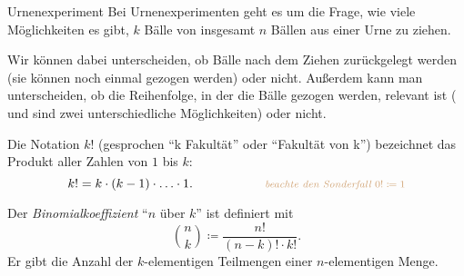 \documentclass[../../main.tex]{subfiles}
\begin{document}
    \begin{nutshell}{Urnenexperiment}
        Bei Urnenexperimenten geht es um die Frage, wie viele Möglichkeiten es gibt, $k$ Bälle von insgesamt $n$ Bällen aus einer Urne zu ziehen.
        
        Wir können dabei unterscheiden, ob Bälle nach dem Ziehen zurückgelegt werden (sie können noch einmal gezogen werden) oder nicht. Außerdem kann man unterscheiden, ob die Reihenfolge, in der die Bälle gezogen werden, relevant ist (\redball\blueball{} und \blueball\redball{} sind zwei unterschiedliche Möglichkeiten) oder nicht.
        \begin{center}
        \end{center}
        
        Die Notation $k!$ (gesprochen \enquote{k Fakultät} oder \enquote{Fakultät von k}) bezeichnet das Produkt aller Zahlen von $1$ bis $k$:
        $$k! = k \cdot (k-1) \cdot \ldots \cdot 1. \hspace{2cm}\text{\footnotesize\textcolor{brown!70}{\emph{beachte den Sonderfall $0! \coloneqq 1$}}}$$
        
        Der \emph{Binomialkoeffizient} \enquote{$n$ über $k$} ist definiert mit
        $$\binom{n}{k} \coloneqq \frac{n!}{(n-k)!\cdot k!}.$$
        Er gibt die Anzahl der $k$-elementigen Teilmengen einer $n$-elementigen Menge.
    \end{nutshell}
\end{document}
